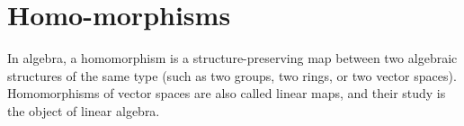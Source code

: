 \section{Homo-morphisms}

In algebra, a homomorphism is a structure-preserving map between two algebraic structures of the same type (such as two groups, two rings, or two vector spaces). Homomorphisms of vector spaces are also called linear maps, and their study is the object of linear algebra.\\






